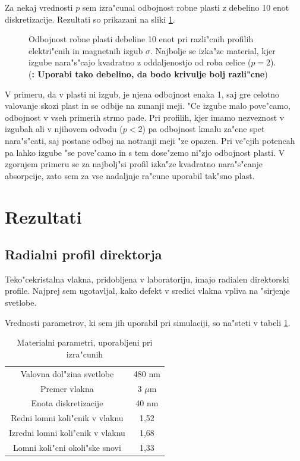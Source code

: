 \documentclass[a4paper,10pt]{article}
\newcommand{\todo}[1]{(\textbf{\textsmaller{TODO}: #1})}
\begin{document}
Za nekaj vrednosti $p$ sem izra"cunal odbojnost robne plasti z debelino 10 enot diskretizacije. 
Rezultati so prikazani na sliki \ref{fig:test-absorption}. 

\begin{figure}[h]
 
 \caption{Odbojnost robne plasti debeline 10 enot pri razli"cnih profilih elektri"cnih in magnetnih izgub $\sigma$. Najbolje se izka"ze material, kjer izgube nara"s"cajo kvadratno z oddaljenostjo od roba celice ($p=2$). 
 \todo{Uporabi tako debelino, da bodo krivulje bolj razli"cne}
 }
 \label{fig:test-absorption}
\end{figure}

V primeru, da v plasti ni izgub, je njena odbojnost enaka 1, saj gre celotno valovanje skozi plast in se odbije na zunanji meji. 
"Ce izgube malo pove"camo, odbojnost v vseh primerih strmo pade. 
Pri profilih, kjer imamo nezveznost v izgubah ali v njihovem odvodu ($p<2$) pa odbojnost kmalu za"cne spet nara"s"cati, saj postane odboj na notranji meji "ze opazen.
Pri ve"cjih potencah pa lahko izgube "se pove"camo in s tem dose"zemo ni"zjo odbojnost plasti. 
V zgornjem primeru se za najbolj"si profil izka"ze kvadratno nara"s"canje absorpcije, zato sem za vse nadaljnje ra"cune uporabil tak"sno plast. 

\section{Rezultati}

\subsection{Radialni profil direktorja}

Teko"cekristalna vlakna, pridobljena v laboratoriju, imajo radialen direktorski profile. 
Najprej sem ugotavljal, kako defekt v sredici vlakna vpliva na "sirjenje svetlobe. 

Vrednosti parametrov, ki sem jih uporabil pri simulaciji, so na"steti v tabeli \ref{tab:parametri}. 

\begin{table}[h]
\centering
 \begin{tabular}{|c|c|}
  \hline
  Valovna dol"zina svetlobe & 480 nm \\
  Premer vlakna & 3 $\mu$m \\
  Enota diskretizacije & 40 nm \\
  \hline
  Redni lomni koli"cnik v vlaknu & 1,52 \\
  Izredni lomni koli"cnik v vlaknu & 1,68 \\
  Lomni koli"cni okoli"ske snovi & 1,33 \\
  \hline
 \end{tabular}
 \caption{Materialni parametri, uporabljeni pri izra"cunih}
 \label{tab:parametri}
\end{table}
\end{document}
